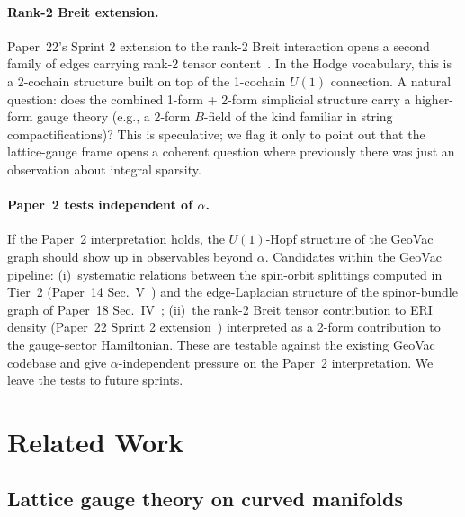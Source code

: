 \documentclass[aps,pra,twocolumn,superscriptaddress,longbibliography]{revtex4-2}
\begin{document}
\paragraph*{Rank-2 Breit extension.} Paper~22's Sprint 2 extension
to the rank-2 Breit interaction opens a second family of edges
carrying rank-2 tensor content~\cite{Paper22}.  In the Hodge
vocabulary, this is a 2-cochain structure built on top of the
1-cochain $U(1)$ connection.  A natural question: does the combined
1-form + 2-form simplicial structure carry a higher-form gauge
theory (e.g., a 2-form $B$-field of the kind familiar in string
compactifications)?  This is speculative; we flag it only to point
out that the lattice-gauge frame opens a coherent question where
previously there was just an observation about integral sparsity.

\paragraph*{Paper~2 tests independent of $\alpha$.} If the Paper~2
interpretation holds, the $U(1)$-Hopf structure of the GeoVac graph
should show up in observables beyond $\alpha$.  Candidates within
the GeoVac pipeline: (i)~systematic relations between the spin-orbit
splittings computed in Tier~2 (Paper~14 Sec.~V~\cite{Paper14}) and
the edge-Laplacian structure of the spinor-bundle graph of
Paper~18 Sec.~IV~\cite{Paper18}; (ii)~the rank-2 Breit tensor
contribution to ERI density (Paper~22 Sprint 2
extension~\cite{Paper22}) interpreted as a 2-form contribution to
the gauge-sector Hamiltonian.  These are testable against the
existing GeoVac codebase and give $\alpha$-independent pressure on
the Paper~2 interpretation.  We leave the tests to future sprints.


\section{Related Work}
\label{sec:relatedwork}

\subsection{Lattice gauge theory on curved manifolds}
\end{document}
